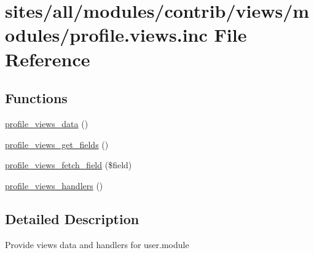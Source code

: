 \hypertarget{profile_8views_8inc}{
\section{sites/all/modules/contrib/views/modules/profile.views.inc File Reference}
\label{profile_8views_8inc}
}
\subsection*{Functions}
\begin{CompactItemize}
\item 
\hyperlink{group__views__profile__module_ga426eb57d5065555896e709b6f109c30}{profile\_\-views\_\-data} ()
\item 
\hyperlink{group__views__profile__module_g8bf1ee086c336dadb69e8fe8728f17f0}{profile\_\-views\_\-get\_\-fields} ()
\item 
\hyperlink{group__views__profile__module_gc5cda8db9f492d20dcbf2054cd1b0ad4}{profile\_\-views\_\-fetch\_\-field} (\$field)
\item 
\hyperlink{group__views__profile__module_g64024760f0192ab4df583fa16da18b4d}{profile\_\-views\_\-handlers} ()
\end{CompactItemize}


\subsection{Detailed Description}
Provide views data and handlers for user.module 